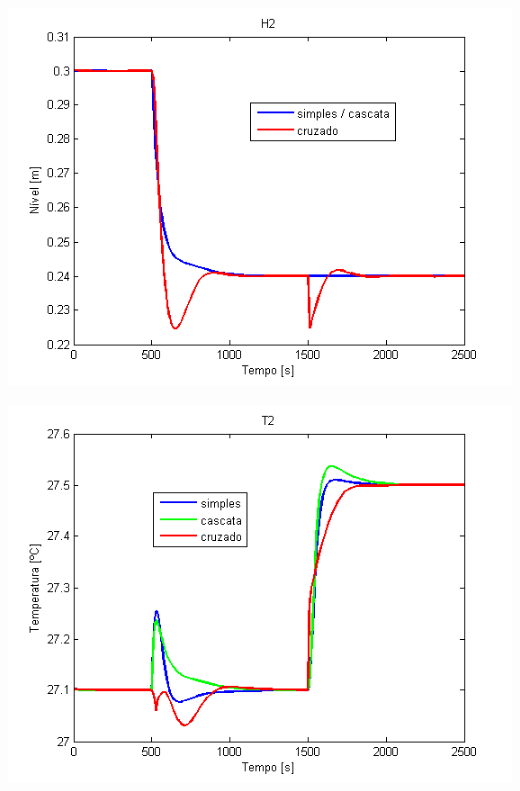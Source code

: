 \documentclass[a0,portrait]{a0poster}
\begin{document}
\begin{multicols}{2}
\vspace{0.8cm}
\begin{minipage}{.5\linewidth}
    \begin{center}
\includegraphics[width=1\linewidth]{H2_color}
\end{center}
  \end{minipage}%
  \begin{minipage}{.5\linewidth}
    \begin{center}
\includegraphics[width=1\linewidth]{T2_color}
\end{center}
  \end{minipage}
\vspace{0.5cm}



\end{multicols}
\end{document}
